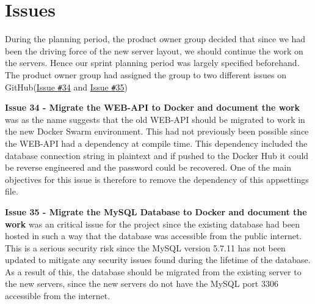 \section{Issues}\label{SEC:Sprint3Issues}
During the planning period, the product owner group decided that since we had been the driving force of the new server layout, we should continue the work on the servers.
Hence our sprint planning period was largely specified beforehand.
The product owner group had assigned the group to two different issues on GitHub(\href{https://github.com/aau-giraf/wiki/issues/34}{Issue \texttt{\#}34} and \href{https://github.com/aau-giraf/wiki/issues/35}{Issue \texttt{\#}35})

\textbf{Issue 34 - Migrate the WEB-API to Docker and document the work} was as the name suggests that the old WEB-API should be migrated to work in the new Docker Swarm environment.
This had not previously been possible since the WEB-API had a dependency at compile time.
This dependency included the database connection string in plaintext and if pushed to the Docker Hub it could be reverse engineered and the password could be recovered.
One of the main objectives for this issue is therefore to remove the dependency of this appsettings file.

\textbf{Issue 35 - Migrate the MySQL Database to Docker and document the work} was an critical issue for the project since the existing database had been hosted in such a way that the database was accessible from the public internet.
This is a serious security risk since the MySQL version 5.7.11 has not been updated to mitigate any security issues found during the lifetime of the database.
As a result of this, the database should be migrated from the existing server to the new servers, since the new servers do not have the MySQL port $3306$ accessible from the internet.
